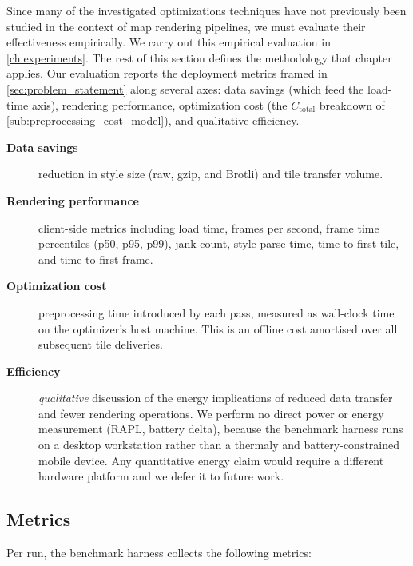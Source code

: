 {Since many of the investigated optimizations techniques have not previously been studied in the context of map rendering pipelines, we must evaluate their effectiveness empirically.
We carry out this empirical evaluation in \cref{ch:experiments}.
The rest of this section defines the methodology that chapter applies.
Our evaluation reports the deployment metrics framed in \cref{sec:problem_statement} along several axes: data savings (which feed the load-time axis), rendering performance, optimization cost (the $C_\text{total}$ breakdown of \cref{sub:preprocessing_cost_model}), and qualitative efficiency.

\begin{description}
    \item[\textbf{Data savings}] reduction in style size (raw, gzip, and Brotli) and tile transfer volume.
    \item[\textbf{Rendering performance}] client-side metrics including load time, frames per second, frame time percentiles (p50, p95, p99), jank count, style parse time, time to first tile, and time to first frame.
    \item[\textbf{Optimization cost}] preprocessing time introduced by each pass, measured as wall-clock time on the optimizer's host machine.
This is an offline cost amortised over all subsequent tile deliveries.
    \item[\textbf{Efficiency}] \emph{qualitative} discussion of the energy implications of reduced data transfer and fewer rendering operations.  We perform no direct power or energy measurement (\ac{RAPL}, battery delta), because the benchmark harness runs on a desktop workstation rather than a thermaly and battery-constrained mobile device.
Any quantitative energy claim would require a different hardware platform and we defer it to future work.
\end{description}

\subsection{Metrics}\label{sub:metrics}

Per run, the benchmark harness collects the following metrics:

}
